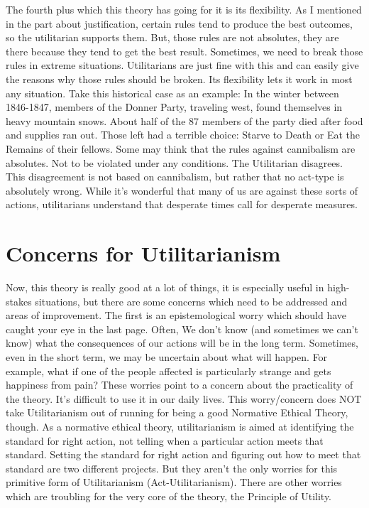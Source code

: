 The fourth plus which this theory has going for it is its flexibility. As I mentioned in the part about justification, certain rules tend to produce the best outcomes, so the utilitarian supports them. But, those rules are not absolutes, they are there because they tend to get the best result. Sometimes, we need to break those rules in extreme situations. Utilitarians are just fine with this and can easily give the reasons why those rules should be broken. Its flexibility lets it work in most any situation. Take this historical case as an example: In the winter between 1846-1847, members of the Donner Party, traveling west, found themselves in heavy mountain snows. About half of the 87 members of the party died after food and supplies ran out. Those left had a terrible choice: Starve to Death or Eat the Remains of their fellows. Some may think that the rules against cannibalism are absolutes. Not to be violated under any conditions. The Utilitarian disagrees. This disagreement is not based on cannibalism, but rather that no act-type is absolutely wrong. While it’s wonderful that many of us are against these sorts of actions, utilitarians understand that desperate times call for desperate measures.

\section{Concerns for Utilitarianism}

Now, this theory is really good at a lot of things, it is especially useful in high-stakes situations, but there are some concerns which need to be addressed and areas of improvement. The first is an epistemological worry which should have caught your eye in the last page. Often, We don’t know (and sometimes we can't know) what the consequences of our actions will be in the long term. Sometimes, even in the short term, we may be uncertain about what will happen. For example, what if one of the people affected is particularly strange and gets happiness from pain? These worries point to a concern about the practicality of the theory.  It's difficult to use it in our daily lives. This worry/concern does NOT take Utilitarianism out of running for being a good Normative Ethical Theory, though. As a normative ethical theory, utilitarianism is aimed at identifying the standard for right action, not telling when a particular action meets that standard. Setting the standard for right action and figuring out how to meet that standard are two different projects. But they aren't the only worries for this primitive form of Utilitarianism (Act-Utilitarianism). There are other worries which are troubling for the very core of the theory, the Principle of Utility.

